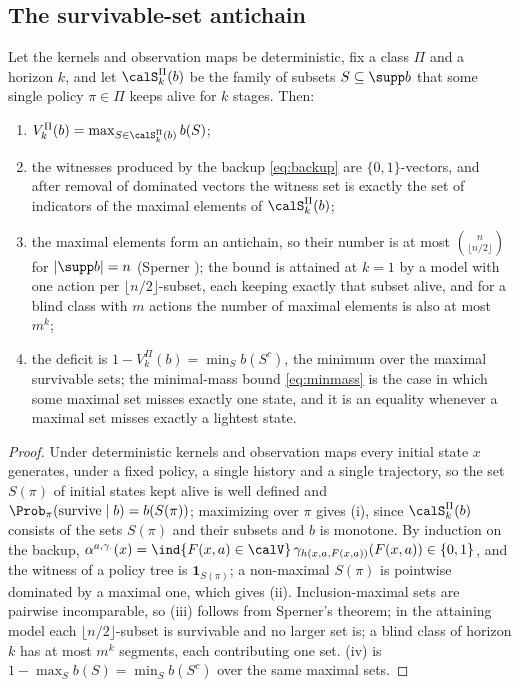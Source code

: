 \subsection{The survivable-set antichain}

\begin{theorem}\label{thm:antichain}
Let the kernels and observation maps be deterministic, fix a class $\Pi$ and a horizon $k$, and let $\calS^{\Pi}_k(b)$ be the family of subsets $S\subseteq\supp b$ that some single policy $\pi\in\Pi$ keeps alive for $k$ stages. Then:
\begin{enumerate}[leftmargin=1.6em,itemsep=1pt]
\item[(i)] $V^{\Pi}_k(b)=\max_{S\in\calS^{\Pi}_k(b)}b(S)$;
\item[(ii)] the witnesses produced by the backup \eqref{eq:backup} are $\{0,1\}$-vectors, and after removal of dominated vectors the witness set is exactly the set of indicators of the maximal elements of $\calS^{\Pi}_k(b)$;
\item[(iii)] the maximal elements form an antichain, so their number is at most $\binom{n}{\lfloor n/2\rfloor}$ for $|\supp b|=n$ (Sperner \cite{Sperner1928}); the bound is attained at $k=1$ by a model with one action per $\lfloor n/2\rfloor$-subset, each keeping exactly that subset alive, and for a blind class with $m$ actions the number of maximal elements is also at most $m^{k}$;
\item[(iv)] the deficit is $1-V^{\Pi}_k(b)=\min_S b(S^{c})$, the minimum over the maximal survivable sets; the minimal-mass bound \eqref{eq:minmass} is the case in which some maximal set misses exactly one state, and it is an equality whenever a maximal set misses exactly a lightest state.
\end{enumerate}
\end{theorem}

\begin{proof}
Under deterministic kernels and observation maps every initial state $x$ generates, under a fixed policy, a single history and a single trajectory, so the set $S(\pi)$ of initial states kept alive is well defined and $\Prob_\pi(\text{survive}\mid b)=b(S(\pi))$; maximizing over $\pi$ gives (i), since $\calS^{\Pi}_k(b)$ consists of the sets $S(\pi)$ and their subsets and $b$ is monotone. By induction on the backup, $\alpha^{a,\gamma_\cdot}(x)=\ind{F(x,a)\in\calV}\,\gamma_{h(x,a,F(x,a))}(F(x,a))\in\{0,1\}$, and the witness of a policy tree is $\mathbf 1_{S(\pi)}$; a non-maximal $S(\pi)$ is pointwise dominated by a maximal one, which gives (ii). Inclusion-maximal sets are pairwise incomparable, so (iii) follows from Sperner's theorem; in the attaining model each $\lfloor n/2\rfloor$-subset is survivable and no larger set is; a blind class of horizon $k$ has at most $m^{k}$ segments, each contributing one set. (iv) is $1-\max_S b(S)=\min_S b(S^{c})$ over the same maximal sets.
\end{proof}

